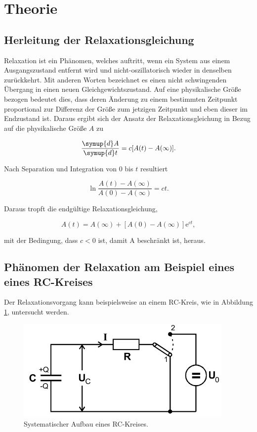 \section{Theorie}
\label{sec:Theorie}
\subsection{Herleitung der Relaxationsgleichung}
Relaxation ist ein Phänomen, welches auftritt, wenn ein System aus einem Ausgangszustand entfernt wird und nicht-oszillatorisch wieder in denselben zurückkehrt.
Mit anderen Worten bezeichnet es einen nicht schwingenden Übergang in einen neuen Gleichgewichtszustand.
Auf eine physikalische Größe bezogen bedeutet dies, dass deren Änderung zu einem bestimmten Zeitpunkt proportional zur Differenz der Größe zum jetzigen Zeitpunkt und eben dieser im Endzustand ist.
Daraus ergibt sich der Ansatz der Relaxationsgleichung in Bezug auf die physikalische Größe $A$ zu

\begin{equation}
 \frac{\symup{d} A}{\symup{d} t} = c [A(t) - A(\infty)].
\end{equation}

Nach Separation und Integration von $0$ bis $t$ resultiert

\begin{equation}
 \ln\frac{A(t)-A(\infty)}{A(0)-A(\infty)} = ct.
\end{equation}

Daraus tropft die endgültige Relaxationsgleichung,

\begin{equation}
  A(t) = A(\infty) + [A(0) - A(\infty)] \mathrm{e}^{ct}, \label{eqn:gl}
\end{equation}

mit der Bedingung, dass $c<0$ ist, damit A beschränkt ist, heraus.\\
\subsection{Phänomen der Relaxation am Beispiel eines eines RC-Kreises}
Der Relaxationsvorgang kann beispielsweise an einem RC-Kreis, wie in Abbildung \ref{fig:1}, untersucht werden.

\begin{figure}[H]
  \centering
  \includegraphics[height=5cm]{kreis.png}
  \caption{Systematischer Aufbau eines RC-Kreises. \cite{sample}}
  \label{fig:1}
\end{figure}

